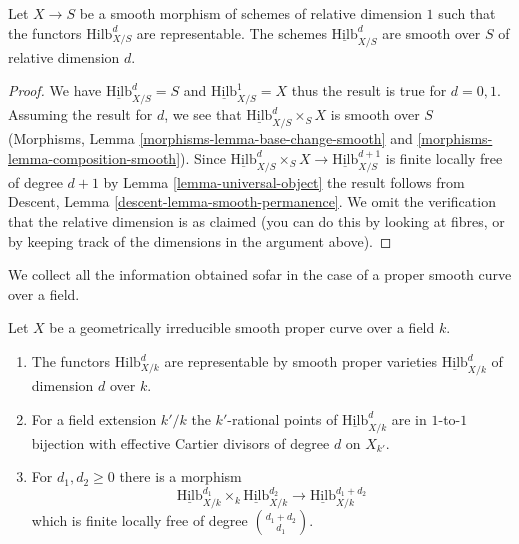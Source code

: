 \begin{lemma}
\label{lemma-hilb-d-smooth}
Let $X \to S$ be a smooth morphism of schemes of relative dimension $1$
such that the functors $\text{Hilb}^d_{X/S}$ are representable. The
schemes $\underline{\text{Hilb}}^d_{X/S}$ are smooth over $S$ of
relative dimension $d$.
\end{lemma}

\begin{proof}
We have $\underline{\text{Hilb}}^d_{X/S} = S$ and
$\underline{\text{Hilb}}^1_{X/S} = X$ thus the result is true for $d = 0, 1$.
Assuming the result for $d$, we see that
$\underline{\text{Hilb}}^d_{X/S} \times_S X$ is smooth over $S$
(Morphisms, Lemma \ref{morphisms-lemma-base-change-smooth} and
\ref{morphisms-lemma-composition-smooth}). Since
$\underline{\text{Hilb}}^d_{X/S} \times_S X \to
\underline{\text{Hilb}}^{d + 1}_{X/S}$
is finite locally free of degree $d + 1$ by
Lemma \ref{lemma-universal-object}
the result follows from
Descent, Lemma \ref{descent-lemma-smooth-permanence}.
We omit the verification that the relative dimension is
as claimed (you can do this by looking at fibres, or by
keeping track of the dimensions in the argument above).
\end{proof}

\noindent
We collect all the information obtained sofar in the case of
a proper smooth curve over a field.

\begin{proposition}
\label{proposition-hilb-d}
Let $X$ be a geometrically irreducible smooth proper curve over a field $k$.
\begin{enumerate}
\item The functors $\text{Hilb}^d_{X/k}$ are representable by smooth
proper varieties $\underline{\text{Hilb}}^d_{X/k}$ of dimension
$d$ over $k$.
\item For a field extension $k'/k$ the $k'$-rational points
of $\underline{\text{Hilb}}^d_{X/k}$ are in $1$-to-$1$ bijection
with effective Cartier divisors of degree $d$ on $X_{k'}$.
\item For $d_1, d_2 \geq 0$ there is a morphism
$$
\underline{\text{Hilb}}^{d_1}_{X/k}
\times_k
\underline{\text{Hilb}}^{d_2}_{X/k}
\longrightarrow
\underline{\text{Hilb}}^{d_1 + d_2}_{X/k}
$$
which is finite locally free of degree ${d_1 + d_2 \choose d_1}$.
\end{enumerate}
\end{proposition}

